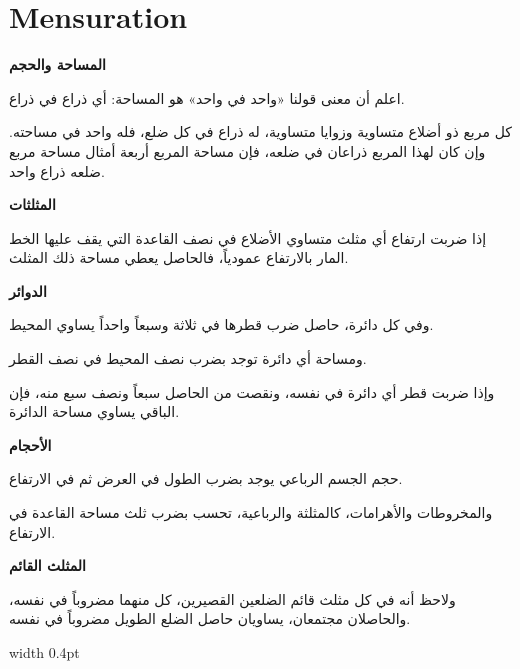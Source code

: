 \documentclass[11pt,a4paper,openany,oneside]{book}
\begin{document}
\newpage

\chapter{Mensuration}
\label{ch:mensuration}

\noindent\begin{minipage}[t]{0.48\textwidth}
\raggedleft

\begin{Arabic}
\textbf{المساحة والحجم}

اعلم أن معنى قولنا «واحد في واحد» هو المساحة: أي ذراع في ذراع.

كل مربع ذو أضلاع متساوية وزوايا متساوية، له ذراع في كل ضلع، فله واحد في مساحته. وإن كان لهذا المربع ذراعان في ضلعه، فإن مساحة المربع أربعة أمثال مساحة مربع ضلعه ذراع واحد.

\textbf{المثلثات}

إذا ضربت ارتفاع أي مثلث متساوي الأضلاع في نصف القاعدة التي يقف عليها الخط المار بالارتفاع عمودياً، فالحاصل يعطي مساحة ذلك المثلث.

\textbf{الدوائر}

وفي كل دائرة، حاصل ضرب قطرها في ثلاثة وسبعاً واحداً يساوي المحيط.

ومساحة أي دائرة توجد بضرب نصف المحيط في نصف القطر.

وإذا ضربت قطر أي دائرة في نفسه، ونقصت من الحاصل سبعاً ونصف سبع منه، فإن الباقي يساوي مساحة الدائرة.

\textbf{الأحجام}

حجم الجسم الرباعي يوجد بضرب الطول في العرض ثم في الارتفاع.

والمخروطات والأهرامات، كالمثلثة والرباعية، تحسب بضرب ثلث مساحة القاعدة في الارتفاع.

\textbf{المثلث القائم}

ولاحظ أنه في كل مثلث قائم الضلعين القصيرين، كل منهما مضروباً في نفسه، والحاصلان مجتمعان، يساويان حاصل الضلع الطويل مضروباً في نفسه.
\end{Arabic}

\end{minipage}%
\hfill\vrule width 0.4pt\hfill
\end{document}

